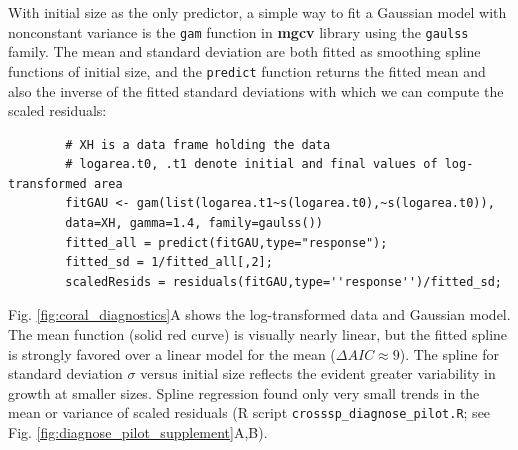 \documentclass[12pt]{article}
\begin{document}
\begin{spacing}{1.35}
	With initial size as the only predictor, a simple way to fit a Gaussian model with nonconstant variance is the \texttt{gam} function in \textbf{mgcv} library \citep{wood-2017} using the \texttt{gaulss} family. 
	The mean and standard deviation are both fitted as smoothing spline functions of initial size, and the \texttt{predict} function returns the fitted mean and also the inverse of the fitted standard deviations with which we can compute the scaled residuals: 
	\begin{lstlisting}
		# XH is a data frame holding the data
		# logarea.t0, .t1 denote initial and final values of log-transformed area   
		fitGAU <- gam(list(logarea.t1~s(logarea.t0),~s(logarea.t0)),
		data=XH, gamma=1.4, family=gaulss())
		fitted_all = predict(fitGAU,type="response"); 
		fitted_sd = 1/fitted_all[,2]; 
		scaledResids = residuals(fitGAU,type=''response'')/fitted_sd;  
	\end{lstlisting}
	Fig. \ref{fig:coral_diagnostics}A shows the log-transformed data and Gaussian model. 
	The mean function (solid red curve) is visually nearly linear, but the fitted spline is strongly favored over a linear model for the mean ($\Delta AIC \approx 9$). 
	The spline for standard deviation $\sigma$ versus initial size reflects the evident greater variability in growth at smaller sizes.  
	Spline regression found only very small trends in the mean or variance of scaled residuals (R script \texttt{crosssp\_diagnose\_pilot.R}; see Fig. \ref{fig:diagnose_pilot_supplement}A,B). 
	

\end{spacing}
\end{document}
